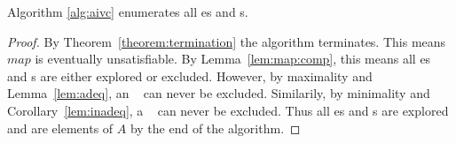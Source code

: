\begin{theorem}
\label{theorem:aivc}
  Algorithm \ref{alg:aivc} enumerates all \mis es and \mivc s.
\end{theorem}
\begin{proof}
By Theorem~\ref{theorem:termination} the algorithm terminates. This
means $map$ is eventually unsatisfiable. By Lemma~\ref{lem:map:comp},
this means all \mis es and \mivc s are either explored or excluded.
However, by maximality and Lemma~\ref{lem:adeq}, an \mis~ can never be
excluded. Similarily, by minimality and Corollary~\ref{lem:inadeq}, a
\mivc~ can never be excluded. Thus all \mis es and \mivc s are
explored and are elements of $A$ by the end of the algorithm.









%



\end{proof}

